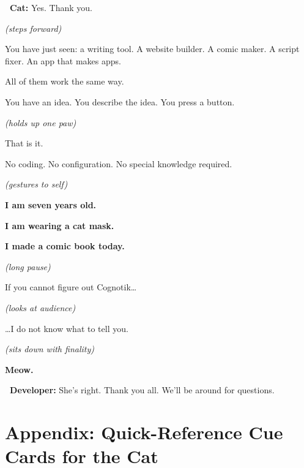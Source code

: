 \documentclass[12pt, letterpaper]{article}
\newcommand{\dev}{\textbf{\color{cogblue}\faIcon{laptop-code}\ Developer:}}
\newcommand{\cat}{\textbf{\color{catpink}\faIcon{cat}\ Cat:}}
\begin{document}
  \begin{catbox}
    \cat{} \large Yes. Thank you.

    \medskip
    {\large\textit{(steps forward)}}

    \medskip
    {\large You have just seen: a writing tool. A website builder. A comic maker.
    A script fixer. An app that makes apps.}

    \medskip
    {\large All of them work the same way.}

    \medskip
    {\large You have an idea. You describe the idea. You press a button.}

    \medskip
    {\large\textit{(holds up one paw)}}

    \medskip
    {\large That is it.}

    \medskip
    {\large No coding. No configuration. No special knowledge required.}

    \medskip
    {\large\textit{(gestures to self)}}

    \medskip
    {\Large\bfseries I am seven years old.}

    \medskip
    {\Large\bfseries I am wearing a cat mask.}

    \medskip
    {\Large\bfseries I made a comic book today.}

    \medskip
    {\large\textit{(long pause)}}

    \medskip
    {\Large If you cannot figure out Cognotik\ldots}

    \medskip
    {\large\textit{(looks at audience)}}

    \medskip
    {\Large \ldots I do not know what to tell you.}

    \medskip
    {\large\textit{(sits down with finality)}}

    \medskip
    {\Large\bfseries Meow.}
  \end{catbox}

  \begin{developerbox}
    \dev{} She's right. Thank you all. We'll be around for questions.
  \end{developerbox}

  \newpage

  \section{Appendix: Quick-Reference Cue Cards for the Cat}
\end{document}
